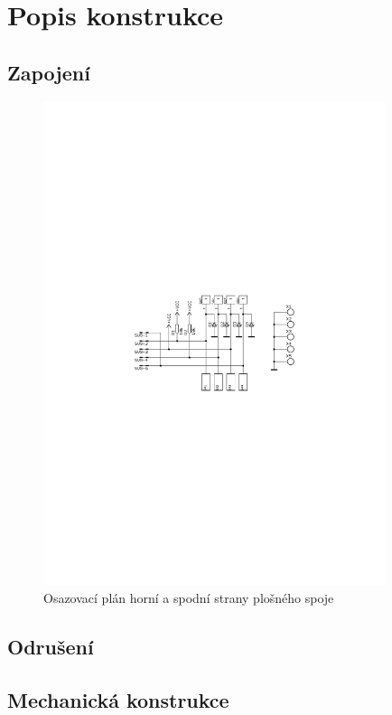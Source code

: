 \documentclass[12pt,a4paper,oneside]{article}
\begin{document}
\newpage

\section{Popis konstrukce}

\subsection{Zapojení}

\begin{figure} [h!tbp]
  \centering
  \includegraphics[trim = 5.0cm 11.5cm 5.0cm 11.5cm, clip, width=10cm]{../../CAM_DOC/SCH.pdf}
  \caption{Osazovací plán horní a spodní strany plošného spoje}
  \label{fig:osazovaci_plan}
\end{figure}

\subsection{Odrušení}

\subsection{Mechanická konstrukce}
\end{document}
